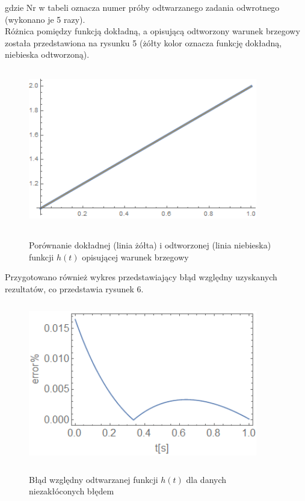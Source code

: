 \documentclass[twoside]{projektInzynierskiMS1}
\begin{document}
gdzie Nr w tabeli oznacza numer próby odtwarzanego zadania odwrotnego (wykonano je 5 razy). \\


Różnica pomiędzy funkcją dokładną, a opisującą odtworzony warunek brzegowy została przedstawiona na rysunku 5 (żółty kolor oznacza funkcję dokładną, niebieska odtworzoną).

\begin{figure}[H]
\begin{center}
		\includegraphics[height=7cm, width=10cm]{pics/0reconstruction.png}\\
	\caption{Porównanie dokładnej (linia żółta) i odtworzonej (linia niebieska) funkcji $h(t)$ opisującej warunek brzegowy}
\end{center}
\end{figure}

Przygotowano również wykres przedstawiający błąd względny uzyskanych rezultatów, co przedstawia rysunek 6. \\

\begin{figure}[H]
\begin{center}
		\includegraphics[height=7cm, width=10cm]{pics/0abs.png}\\
	\caption{Błąd względny odtwarzanej funkcji $h(t)$ dla danych niezakłóconych błędem}
\end{center}
\end{figure}
\end{document}
